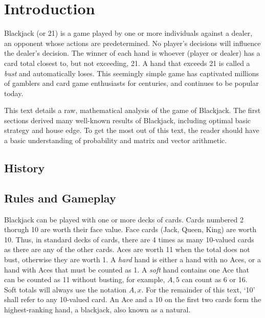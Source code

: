 
\chapter{Introduction}
\label{sec:intro}

Blackjack (or 21) is a game played by one or more individuals against
a dealer, an opponent whose actions are predetermined.
No player's decisions will influence the dealer's decision.  
The winner of each hand is whoever (player or dealer)
has a card total closest to, but not exceeding, 21.  
A hand that exceeds 21 is called a
\emph{bust} and automatically loses.
This seemingly simple game has captivated millions of gamblers
and card game enthusiasts for centuries, 
and continues to be popular today.

This text details a raw, mathematical analysis of the game of Blackjack.
The first sections derived many well-known results of Blackjack, 
including optimal basic strategy and house edge.
To get the most out of this text, the reader should have a 
basic understanding of probability and matrix and vector arithmetic.



\section{History}
\label{sec:intro:history}


\section{Rules and Gameplay}
\label{sec:intro:rules}

Blackjack can be played with one or more decks of cards.
Cards numbered 2 thorugh 10 are worth their face value.  
Face cards (Jack, Queen, King) are worth 10.
Thus, in standard decks of cards, there are 4 times as many 10-valued 
cards as there are any of the other cards.
Aces are worth 11 when the total does not bust,
otherwise they are worth 1.
A \emph{hard} hand is either a hand with no Aces,
or a hand with Aces that must be counted as 1.
A \emph{soft} hand contains one Ace that can be 
counted as 11 without busting, for example, $A,5$ can count as 6 or 16.
Soft totals will always use the notation $A,x$.
For the remainder of this text, `10' shall refer to any 10-valued card.
An Ace and a 10 on the first two cards form the 
highest-ranking hand, a blackjack, 
also known as a natural.

